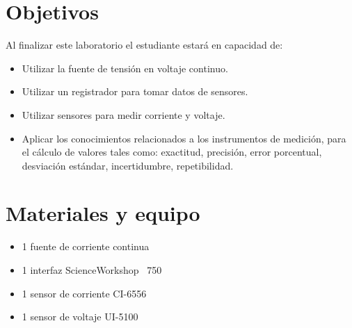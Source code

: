 \documentclass[12pt,letterpaper]{report}
\newcommand{\obj}{Objetivos}
\newcommand{\mat}{Materiales y equipo}
\newcommand{\capacidad}{Al finalizar este laboratorio el estudiante estará en capacidad de:}
\begin{document}
\section{\obj}
\capacidad
\begin{itemize}
\item Utilizar la fuente de tensión en voltaje continuo.
\item Utilizar un registrador para tomar datos de sensores.
\item Utilizar sensores para medir corriente y voltaje.
\item Aplicar los conocimientos relacionados a los instrumentos de medición, para el cálculo de valores tales como: exactitud, precisión, error porcentual, desviación estándar, incertidumbre, repetibilidad.
\end{itemize}

\section{\mat}
\begin{itemize}
\item 1 fuente de corriente continua
\item 1 interfaz ScienceWorkshop \textregistered\, 750
\item 1 sensor de corriente CI-6556
\item 1 sensor de voltaje UI-5100
\end{itemize}
\end{document}

